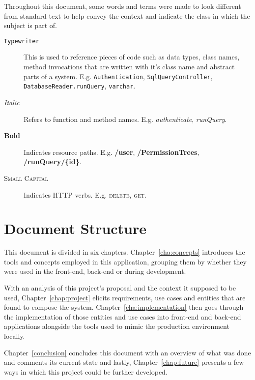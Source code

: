 Throughout this document, some words and terms were made to look different from standard text to help convey the context and indicate the class in which the subject is part of. 

\begin{description}
\item[\texttt{Typewriter}] This is used to reference pieces of code such as data types, class names, method invocations that are written with it's class name and abstract parts of a system. E.g. \texttt{Authentication}, \texttt{SqlQueryController}, \texttt{DatabaseReader.runQuery}, \texttt{varchar}.
\item[\textit{Italic}] Refers to function and method names. E.g. \textit{authenticate}, \textit{runQuery}.
\item[\textbf{Bold}] Indicates resource paths. E.g. \textbf{/user}, \textbf{/PermissionTrees}, \textbf{/runQuery/\{id\}}.
\item[\textsc{Small Capital}] Indicates HTTP verbs. E.g. \textsc{delete}, \textsc{get}.
\end{description}

\section{Document Structure}

This document is divided in six chapters. Chapter~\ref{cha:concepts} introduces the tools and concepts employed in this application, grouping them by whether they were used in the front-end, back-end or during development.

With an analysis of this project's proposal and the context it supposed to be used, Chapter~\ref{chap:project} elicits requirements, use cases and entities that are found to compose the system. Chapter~\ref{cha:implementation} then goes through the implementation of those entities and use cases into front-end and back-end applications alongside the tools used to mimic the production environment locally.

Chapter~\ref{conclusion} concludes this document with an overview of what was done and comments its current state and lastly, Chapter~\ref{chap:future} presents a few ways in which this project could be further developed.